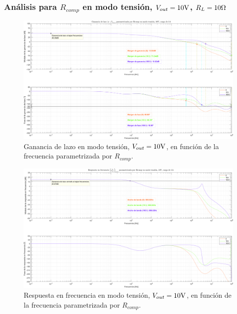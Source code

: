 
\subsubsection{Análisis para $R_{comp}$ en modo tensión, $V_{out} = 10 \si[per-mode=symbol]{\volt}$, $R_{L} = 10 \si[per-mode=symbol]{\ohm}$}

\clearpage

\begin{figure}[H] %
\begin{center}
\includegraphics[width=1.1 \textwidth, angle=90]{./img/plots/loop/power_supply_RCOMP_LOOP_Modo1.png}
\caption{\label{fig:fig_power_supply_RCOMP_LOOP_Modo1}\footnotesize{Ganancia de lazo en modo tensión, $V_{out} = 10 \si[per-mode=symbol]{\volt}$, en función de la frecuencia parametrizada por $R_{comp}$.}}
\end{center}
\end{figure}


\clearpage

\begin{figure}[H] %
\begin{center}
\includegraphics[width=1.1 \textwidth, angle=90]{./img/plots/rf/power_supply_RCOMP_RF_Modo1.png}
\caption{\label{fig:fig_power_supply_RCOMP_RF_Modo1}\footnotesize{Respuesta en frecuencia en modo tensión, $V_{out} = 10 \si[per-mode=symbol]{\volt}$, en función de la frecuencia parametrizada por $R_{comp}$.}}
\end{center}
\end{figure}

